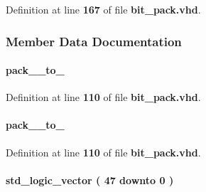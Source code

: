 Definition at line {\bf 167} of file {\bf bit\+\_\+pack.\+vhd}.



\subsubsection{Member Data Documentation}
\paragraph[{inst0}]{ {\bfseries \textcolor{vhdlchar}{pack\+\_\+\_\+to\+\_}\textcolor{vhdlchar}{ }} \hspace{0.3cm}{\ttfamily [Instantiation]}}\label{classbit__pack_1_1arch_a0d4133a632810ebda3d9d0e2127c5517}


Definition at line {\bf 110} of file {\bf bit\+\_\+pack.\+vhd}.

\paragraph[{inst0}]{ {\bfseries \textcolor{vhdlchar}{pack\+\_\+\_\+to\+\_}\textcolor{vhdlchar}{ }} \hspace{0.3cm}{\ttfamily [Instantiation]}}\label{classbit__pack_1_1arch_a0d4133a632810ebda3d9d0e2127c5517}


Definition at line {\bf 110} of file {\bf bit\+\_\+pack.\+vhd}.

\paragraph[{inst0\+\_\+data48\+\_\+in}]{ {\bfseries \textcolor{comment}{std\+\_\+logic\+\_\+vector}\textcolor{vhdlchar}{ }\textcolor{vhdlchar}{(}\textcolor{vhdlchar}{ }\textcolor{vhdlchar}{ } \textcolor{vhdldigit}{47} \textcolor{vhdlchar}{ }\textcolor{keywordflow}{downto}\textcolor{vhdlchar}{ }\textcolor{vhdlchar}{ } \textcolor{vhdldigit}{0} \textcolor{vhdlchar}{ }\textcolor{vhdlchar}{)}\textcolor{vhdlchar}{ }} \hspace{0.3cm}{\ttfamily [Signal]}}\label{classbit__pack_1_1arch_a1e6dfaf0313ef8d7ac3893e841518d01}


